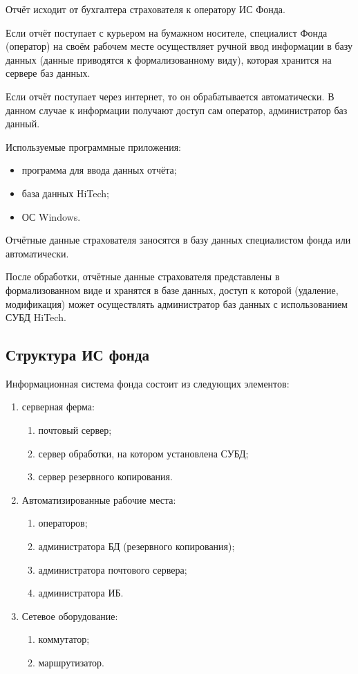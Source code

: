 Отчёт исходит от бухгалтера страхователя к оператору ИС Фонда.

\point Если отчёт поступает с курьером на бумажном носителе, специалист Фонда (оператор) на своём рабочем месте осуществляет ручной ввод информации в базу данных (данные приводятся к формализованному виду), которая хранится на сервере баз данных.

Если отчёт поступает через интернет, то он обрабатывается автоматически. В данном случае к информации получают доступ сам оператор, администратор баз данный.

\point Используемые программные приложения:

\begin{itemize}
\item программа для ввода данных отчёта;
\item база данных HiTech;
\item ОС Windows.
\end{itemize}

\point Отчётные данные страхователя заносятся в базу данных специалистом фонда или автоматически.

\point После обработки, отчётные данные страхователя представлены в формализованном виде и хранятся в базе данных, доступ к которой (удаление, модификация) может осуществлять администратор баз данных с использованием СУБД HiTech.

\subsection{Структура ИС фонда}

\point Информационная система фонда состоит из следующих элементов:

\begin{enumerate}
\item серверная ферма:
  \begin{enumerate}
  \item почтовый сервер;
  \item сервер обработки, на котором установлена СУБД;
  \item сервер резервного копирования.
  \end{enumerate}
\item Автоматизированные рабочие места:
  \begin{enumerate}
  \item операторов;
  \item администратора БД (резервного копирования);
  \item администратора почтового сервера;
  \item администратора ИБ.
  \end{enumerate}
\item Сетевое оборудование:
  \begin{enumerate}
  \item коммутатор;
  \item маршрутизатор.
  \end{enumerate}
\end{enumerate}

